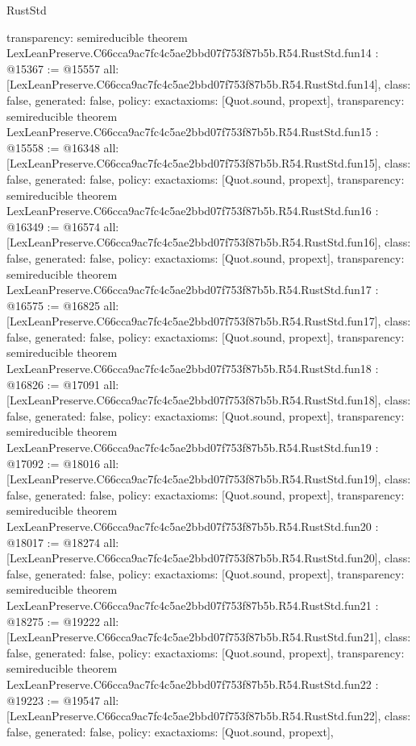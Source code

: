 \begin{lexlean}{RustStd}
\begin{coremodule}
{  transparency: semireducible
}
theorem LexLeanPreserve.C66cca9ac7fc4c5ae2bbd07f753f87b5b.R54.RustStd.fun14 : @15367 := @15557 {
  all: [LexLeanPreserve.C66cca9ac7fc4c5ae2bbd07f753f87b5b.R54.RustStd.fun14],
  class: false,
  generated: false,
  policy: exact{axioms: [Quot.sound, propext]},
  transparency: semireducible
}
theorem LexLeanPreserve.C66cca9ac7fc4c5ae2bbd07f753f87b5b.R54.RustStd.fun15 : @15558 := @16348 {
  all: [LexLeanPreserve.C66cca9ac7fc4c5ae2bbd07f753f87b5b.R54.RustStd.fun15],
  class: false,
  generated: false,
  policy: exact{axioms: [Quot.sound, propext]},
  transparency: semireducible
}
theorem LexLeanPreserve.C66cca9ac7fc4c5ae2bbd07f753f87b5b.R54.RustStd.fun16 : @16349 := @16574 {
  all: [LexLeanPreserve.C66cca9ac7fc4c5ae2bbd07f753f87b5b.R54.RustStd.fun16],
  class: false,
  generated: false,
  policy: exact{axioms: [Quot.sound, propext]},
  transparency: semireducible
}
theorem LexLeanPreserve.C66cca9ac7fc4c5ae2bbd07f753f87b5b.R54.RustStd.fun17 : @16575 := @16825 {
  all: [LexLeanPreserve.C66cca9ac7fc4c5ae2bbd07f753f87b5b.R54.RustStd.fun17],
  class: false,
  generated: false,
  policy: exact{axioms: [Quot.sound, propext]},
  transparency: semireducible
}
theorem LexLeanPreserve.C66cca9ac7fc4c5ae2bbd07f753f87b5b.R54.RustStd.fun18 : @16826 := @17091 {
  all: [LexLeanPreserve.C66cca9ac7fc4c5ae2bbd07f753f87b5b.R54.RustStd.fun18],
  class: false,
  generated: false,
  policy: exact{axioms: [Quot.sound, propext]},
  transparency: semireducible
}
theorem LexLeanPreserve.C66cca9ac7fc4c5ae2bbd07f753f87b5b.R54.RustStd.fun19 : @17092 := @18016 {
  all: [LexLeanPreserve.C66cca9ac7fc4c5ae2bbd07f753f87b5b.R54.RustStd.fun19],
  class: false,
  generated: false,
  policy: exact{axioms: [Quot.sound, propext]},
  transparency: semireducible
}
theorem LexLeanPreserve.C66cca9ac7fc4c5ae2bbd07f753f87b5b.R54.RustStd.fun20 : @18017 := @18274 {
  all: [LexLeanPreserve.C66cca9ac7fc4c5ae2bbd07f753f87b5b.R54.RustStd.fun20],
  class: false,
  generated: false,
  policy: exact{axioms: [Quot.sound, propext]},
  transparency: semireducible
}
theorem LexLeanPreserve.C66cca9ac7fc4c5ae2bbd07f753f87b5b.R54.RustStd.fun21 : @18275 := @19222 {
  all: [LexLeanPreserve.C66cca9ac7fc4c5ae2bbd07f753f87b5b.R54.RustStd.fun21],
  class: false,
  generated: false,
  policy: exact{axioms: [Quot.sound, propext]},
  transparency: semireducible
}
theorem LexLeanPreserve.C66cca9ac7fc4c5ae2bbd07f753f87b5b.R54.RustStd.fun22 : @19223 := @19547 {
  all: [LexLeanPreserve.C66cca9ac7fc4c5ae2bbd07f753f87b5b.R54.RustStd.fun22],
  class: false,
  generated: false,
  policy: exact{axioms: [Quot.sound, propext]},
}
\end{coremodule}
\end{lexlean}
